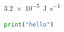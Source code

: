 \documentclass{article}
\begin{document}
\begin{tcolorbox}\SI{3.2e-5}{\joule\per\second}\end{tcolorbox}
\begin{lstlisting}[language=Python]
print("hello")
\end{lstlisting}
\end{document}
